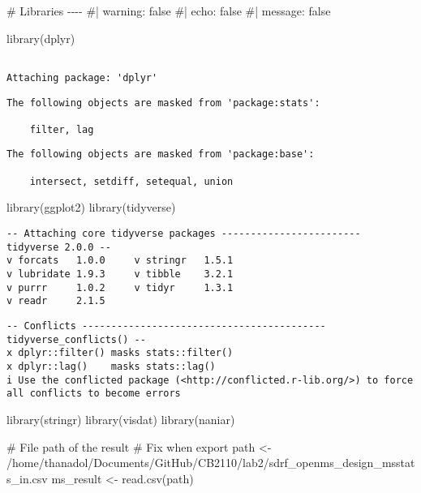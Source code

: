 \documentclass[
  letterpaper,
  DIV=11,
  numbers=noendperiod]{scrartcl}
\newenvironment{Shaded}{\begin{snugshade}}{\end{snugshade}}
\newcommand{\CommentTok}[1]{\textcolor[rgb]{0.37,0.37,0.37}{#1}}
\newcommand{\FunctionTok}[1]{\textcolor[rgb]{0.28,0.35,0.67}{#1}}
\newcommand{\NormalTok}[1]{\textcolor[rgb]{0.00,0.23,0.31}{#1}}
\newcommand{\OtherTok}[1]{\textcolor[rgb]{0.00,0.23,0.31}{#1}}
\newcommand{\StringTok}[1]{\textcolor[rgb]{0.13,0.47,0.30}{#1}}
\begin{document}
\begin{Shaded}
\begin{Highlighting}[]
\CommentTok{\# Libraries {-}{-}{-}{-} }
\CommentTok{\#| warning: false}
\CommentTok{\#| echo: false}
\CommentTok{\#| message: false}

\FunctionTok{library}\NormalTok{(dplyr)}
\end{Highlighting}
\end{Shaded}

\begin{verbatim}

Attaching package: 'dplyr'
\end{verbatim}

\begin{verbatim}
The following objects are masked from 'package:stats':

    filter, lag
\end{verbatim}

\begin{verbatim}
The following objects are masked from 'package:base':

    intersect, setdiff, setequal, union
\end{verbatim}

\begin{Shaded}
\begin{Highlighting}[]
\FunctionTok{library}\NormalTok{(ggplot2)}
\FunctionTok{library}\NormalTok{(tidyverse)}
\end{Highlighting}
\end{Shaded}

\begin{verbatim}
-- Attaching core tidyverse packages ------------------------ tidyverse 2.0.0 --
v forcats   1.0.0     v stringr   1.5.1
v lubridate 1.9.3     v tibble    3.2.1
v purrr     1.0.2     v tidyr     1.3.1
v readr     2.1.5     
\end{verbatim}

\begin{verbatim}
-- Conflicts ------------------------------------------ tidyverse_conflicts() --
x dplyr::filter() masks stats::filter()
x dplyr::lag()    masks stats::lag()
i Use the conflicted package (<http://conflicted.r-lib.org/>) to force all conflicts to become errors
\end{verbatim}

\begin{Shaded}
\begin{Highlighting}[]
\FunctionTok{library}\NormalTok{(stringr)}
\FunctionTok{library}\NormalTok{(visdat)}
\FunctionTok{library}\NormalTok{(naniar)}



\CommentTok{\# File path of the result}
\CommentTok{\# Fix when export}
\NormalTok{path }\OtherTok{\textless{}{-}} \StringTok{\textquotesingle{}/home/thanadol/Documents/GitHub/CB2110/lab2/sdrf\_openms\_design\_msstats\_in.csv\textquotesingle{}}
\NormalTok{ms\_result }\OtherTok{\textless{}{-}} \FunctionTok{read.csv}\NormalTok{(path)}
\end{Highlighting}
\end{Shaded}
\end{document}
